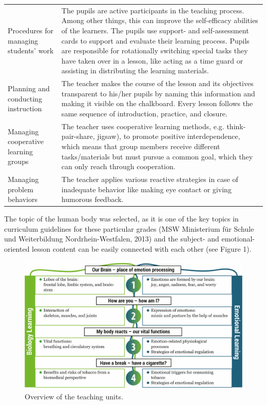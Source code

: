 \documentclass[11.5pt]{sig-alternate} %
\begin{document}
\begin{large}
\begin{table}[thbp]
\begin{tabular}{ll}
Procedures for managing students’ work & The pupils are active participants in the teaching process. Among other things, this can improve the self-efficacy abilities of the learners. The pupils use support- and self-assessment cards to support and evaluate their learning process. Pupils are responsible for rotationally switching special tasks they have taken over in a lesson, like acting as a time guard or assisting in distributing the learning materials. \\
Planning and conducting instruction & The teacher makes the course of the lesson and its objectives transparent to his/her pupils by naming this information and making it visible on the chalkboard. Every lesson follows the same sequence of introduction, practice, and closure. \\
Managing cooperative learning groups & The teacher uses cooperative learning methods, e.g. think-pair-share, jigsaw), to promote positive interdependence, which means that group members receive different tasks/materials but must pursue a common goal, which they can only reach through cooperation. \\
Managing problem behaviors & The teacher applies various reactive strategies in case of inadequate behavior like making eye contact or giving humorous feedback. \\ \hline
\end{tabular}
\end{table}

The topic of the human body was selected, as it is one of the key topics in curriculum guidelines for these particular grades (MSW Ministerium für Schule und Weiterbildung Nordrhein-Westfalen, 2013) and the subject- and emotional-oriented lesson content can be easily connected with each other (see Figure 1). 

\begin{figure}[!h]
    \includegraphics[width=1\textwidth]{images/fig1.png}
    \caption{Overview of the teaching units.}
\end{figure}


\end{large}
\end{document}
